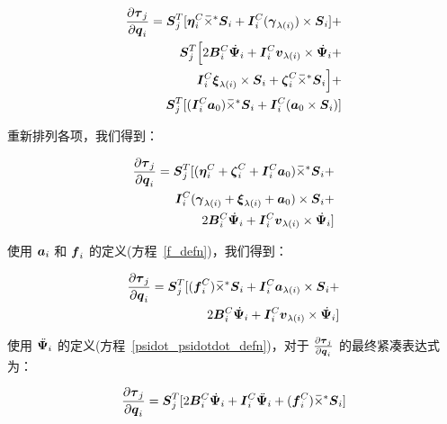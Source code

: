 \documentclass[letterpaper, 10 pt, conference]{ieeetran}  %
\begin{document}
{\begin{enumerate}
\begin{equation}
 \begin{aligned}
    \frac{\partial \taubar_{j}}{\partial \q_{i}} = \Phibar_{j}^{T} [\etabar_{i}^{C} \crff \Phibar_{i} + \I_{i}^{C} (\gammabar_{\lambda(i)})\times \Phibar_{i}  ] + \\
    \Phibar_{j}^{T}  \Big[  2 \B_{i}^{C} \Psibardot_{i}  +  \I_{i}^{C} \v_{\lambda(i)} \times \Psibardot_{i} +  \\
    \I_{i}^{C} \xibar_{\lambda(i)} \times \Phibar_{i}  + 
    \zetabar_{i}^{C} \crff \Phibar_{i} \Big]  + \\
    \Phibar_{j}^{T} [(\I_{i}^{C}\a_{0})\crff \Phibar_{i}+  \I_{i}^{C}(\a_{0} \times \Phibar_{i}) ]
 \end{aligned}
\end{equation}

重新排列各项，我们得到：


\begin{equation}
 \begin{aligned}
    \frac{\partial \boldsymbol{\tau}_{j}}{\partial \boldsymbol{q}_{i}} = \boldsymbol{S}_{j}^{T} [ (\boldsymbol{\eta}_{i}^{C} +\boldsymbol{\zeta}_{i}^{C} +\boldsymbol{I}{}_{i}^{C}\boldsymbol{a}_{0})\,\overline{\!\times\!}{}^{\,*} \boldsymbol{S}_{i} + \\
    \boldsymbol{I}{}_{i}^{C} (\boldsymbol{\gamma}_{\lambda(i)}  +\boldsymbol{\xi}_{\lambda(i)}+\boldsymbol{a}_{0})\times \boldsymbol{S}_{i}  + \\
    2 \boldsymbol{B}{}_{i}^{C} \,\dot{\!\boldsymbol{\Psi}}_{i}  + \boldsymbol{I}{}_{i}^{C} \boldsymbol{v}_{\lambda(i)} \times \,\dot{\!\boldsymbol{\Psi}}_{i}  ]
 \end{aligned}
\end{equation}

使用 $\boldsymbol{a}_{i}$ 和 $\boldsymbol{f}_{i}$ 的定义(方程~\ref{f_defn})，我们得到：

\begin{equation}
    \begin{aligned}
        \frac{\partial \boldsymbol{\tau}_{j}}{\partial \boldsymbol{q}_{i}} = \boldsymbol{S}_{j}^{T} [ (\boldsymbol{f}_{i}^{C} )\,\overline{\!\times\!}{}^{\,*} \boldsymbol{S}_{i} + \boldsymbol{I}{}_{i}^{C} \boldsymbol{a}_{\lambda(i)}\times \boldsymbol{S}_{i}  + \\
        2 \boldsymbol{B}{}_{i}^{C} \,\dot{\!\boldsymbol{\Psi}}_{i}  +   \boldsymbol{I}{}_{i}^{C} \boldsymbol{v}_{\lambda(i)} \times \,\dot{\!\boldsymbol{\Psi}}_{i}  ]
    \end{aligned}
\end{equation}

使用 $\,\ddot{\!\boldsymbol{\Psi}}_{i}$ 的定义(方程~\ref{psidot_psidotdot_defn})，对于 $ \frac{\partial \boldsymbol{\tau}_{j}}{\partial \boldsymbol{q}_{i}}$ 的最终紧凑表达式为：

\begin{equation}
    \frac{\partial \taubar_{j}}{\partial \q_{i}} = \Phibar_{j}^{T} [ 2 \B_{i}^{C} \Psibardot_{i} +  \I_{i}^{C}  \Psibarddot_{i}+(\f_{i}^{C} )\crff \Phibar_{i} ]
    \label{dtau_dq_eqn2}
\end{equation}


\end{enumerate}}
\end{document}
